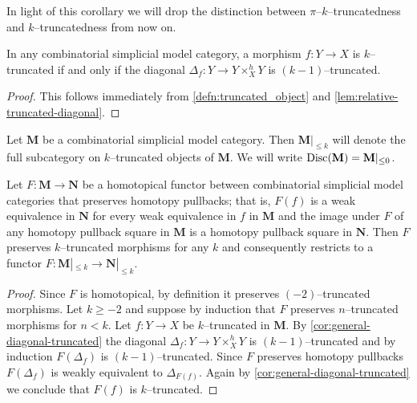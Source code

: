 In light of this corollary we will drop the distinction between \(\pi\)--\(k\)--truncatedness and \(k\)--truncated\-ness from now on.

\begin{corollary}\label{cor:general-diagonal-truncated}
  In any combinatorial simplicial model category, a morphism \(f\colon Y\to X\) is \(k\)--truncated if and only if the diagonal \(\Delta_{f}\colon Y\to Y\times^{h}_{X} Y\) is \((k-1)\)--truncated.
\end{corollary}
\begin{proof}
  This follows immediately from \autoref{defn:truncated_object} and \autoref{lem:relative-truncated-diagonal}.
\end{proof}

\begin{definition}
  Let \(\mathbf{M}\) be a combinatorial simplicial model category. Then \(\mathbf{M}|_{{\leq}k}\) will denote the full subcategory on \(k\)--truncated objects of \(\mathbf{M}\). We will write \(\operatorname{\textnormal{Disc}}(\mathbf M) = \mathbf M|_{\leq 0}\).
\end{definition}

\begin{proposition}\label{prop:truncated-objects-exact-functors}
  Let \(F\colon \mathbf{M}\to\mathbf{N}\) be a homotopical functor between combinatorial simplicial model categories that preserves homotopy pullbacks; that is, \(F(f)\) is a weak equivalence in \(\mathbf N\) for every weak equivalence in \(f\) in \(\mathbf M\) and the image under \(F\) of any homotopy pullback square in \(\mathbf M\) is a homotopy pullback square in \(\mathbf N\). Then \(F\) preserves \(k\)--truncated morphisms for any \(k\) and consequently restricts to a functor \(F\colon \mathbf M|_{\leq k}\to\mathbf N|_{\leq k}\).
\end{proposition}
\begin{proof}
  Since \(F\) is homotopical, by definition it preserves \((-2)\)--truncated morphisms. Let \(k\geq -2\) and suppose by induction that \(F\) preserves \(n\)--truncated morphisms for \(n<k\). Let \(f\colon Y\to X\) be \(k\)--truncated in \(\mathbf M\). By \autoref{cor:general-diagonal-truncated} the diagonal \(\Delta_{f}\colon Y\to Y\times^{h}_{X} Y\) is \((k-1)\)--truncated and by induction \(F(\Delta_{f})\) is \((k-1)\)--truncated. Since \(F\) preserves homotopy pullbacks \(F(\Delta_{f})\) is weakly equivalent to \(\Delta_{F(f)}\). Again by \autoref{cor:general-diagonal-truncated} we conclude that \(F(f)\) is \(k\)--truncated.
\end{proof}


